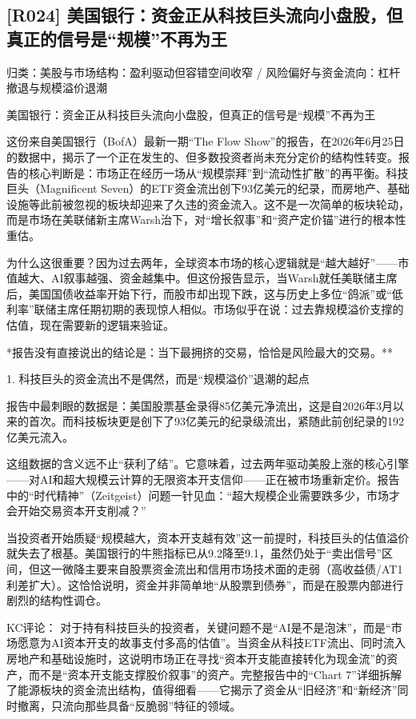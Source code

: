 \documentclass[11pt]{ctexart}
\begin{document}
\subsection{[R024] 美国银行：资金正从科技巨头流向小盘股，但真正的信号是“规模”不再为王}
{\small\color{refgray}归类：美股与市场结构：盈利驱动但容错空间收窄 / 风险偏好与资金流向：杠杆撤退与规模溢价退潮}

美国银行：资金正从科技巨头流向小盘股，但真正的信号是“规模”不再为王

这份来自美国银行（BofA）最新一期“The Flow Show”的报告，在2026年6月25日的数据中，揭示了一个正在发生的、但多数投资者尚未充分定价的结构性转变。报告的核心判断是：市场正在经历一场从“规模崇拜”到“流动性扩散”的再平衡。科技巨头（Magnificent Seven）的ETF资金流出创下93亿美元的纪录，而房地产、基础设施等此前被忽视的板块却迎来了久违的资金流入。这不是一次简单的板块轮动，而是市场在美联储新主席Warsh治下，对“增长叙事”和“资产定价锚”进行的根本性重估。

为什么这很重要？因为过去两年，全球资本市场的核心逻辑就是“越大越好”——市值越大、AI叙事越强、资金越集中。但这份报告显示，当Warsh就任美联储主席后，美国国债收益率开始下行，而股市却出现下跌，这与历史上多位“鸽派”或“低利率”联储主席任期初期的表现惊人相似。市场似乎在说：过去靠规模溢价支撑的估值，现在需要新的逻辑来验证。

*报告没有直接说出的结论是：当下最拥挤的交易，恰恰是风险最大的交易。**

1. 科技巨头的资金流出不是偶然，而是“规模溢价”退潮的起点

报告中最刺眼的数据是：美国股票基金录得85亿美元净流出，这是自2026年3月以来的首次。而科技板块更是创下了93亿美元的纪录级流出，紧随此前创纪录的192亿美元流入。

这组数据的含义远不止“获利了结”。它意味着，过去两年驱动美股上涨的核心引擎——对AI和超大规模云计算的无限资本开支信仰——正在被市场重新定价。报告中的“时代精神”（Zeitgeist）问题一针见血：“超大规模企业需要跌多少，市场才会开始交易资本开支削减？”

当投资者开始质疑“规模越大，资本开支越有效”这一前提时，科技巨头的估值溢价就失去了根基。美国银行的牛熊指标已从9.2降至9.1，虽然仍处于“卖出信号”区间，但这一微降主要来自股票资金流出和信用市场技术面的走弱（高收益债/AT1利差扩大）。这恰恰说明，资金并非简单地“从股票到债券”，而是在股票内部进行剧烈的结构性调仓。

KC评论： 对于持有科技巨头的投资者，关键问题不是“AI是不是泡沫”，而是“市场愿意为AI资本开支的故事支付多高的估值”。当资金从科技ETF流出、同时流入房地产和基础设施时，这说明市场正在寻找“资本开支能直接转化为现金流”的资产，而不是“资本开支能支撑股价叙事”的资产。完整报告中的“Chart 7”详细拆解了能源板块的资金流出结构，值得细看——它揭示了资金从“旧经济”和“新经济”同时撤离，只流向那些具备“反脆弱”特征的领域。
\end{document}
